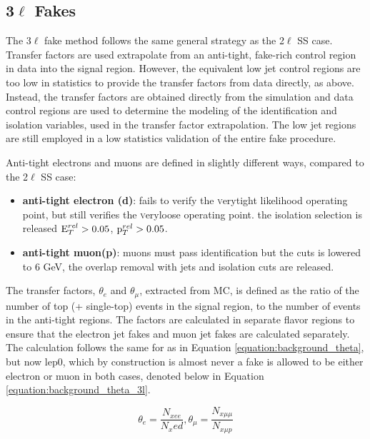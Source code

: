



\subsection{3$\ell$ Fakes}

The 3$\ell$ fake method follows the same general strategy as the 2$\ell$ SS case. Transfer factors are used extrapolate from an anti-tight, fake-rich control region in data into the signal region.  However, the equivalent low jet control regions are too low in statistics to provide the transfer factors from data directly, as above. Instead, the transfer factors are obtained directly from the \ttbar simulation and data control regions are used to determine the modeling of the identification and isolation variables, used in the transfer factor extrapolation. The low jet regions are still employed in a low statistics validation of the entire fake procedure. 

Anti-tight electrons and muons are defined in slightly different ways, compared to the 2$\ell$ SS case:
\begin{itemize}
\item {\bf anti-tight electron (d)}: fails to verify the {\textsc verytight} likelihood operating point, but still verifies the {\textsc veryloose} operating point. the isolation selection is released $\rm E_{T}^{rel}>0.05$,  $\rm p_{T}^{rel}>0.05$.

\item {\bf anti-tight muon(p)}: muons must pass identification but the \pt cuts is lowered to 6 GeV, the overlap removal with jets and isolation cuts are released.
\end{itemize} 
The transfer factors, $\theta_e$ and $\theta_{\mu}$, extracted from MC, is defined as the ratio of the number of top (\ttbar + single-top) events in the signal region, to the number of \ttbar events in the anti-tight regions. The factors are calculated in separate flavor regions to ensure that the electron jet fakes and muon jet fakes are calculated separately. The calculation follows the same for as in Equation \ref{equation:background_theta}, but now lep0, which by construction is almost never a fake is allowed to be either electron or muon in both cases, denoted below in Equation \ref{equation:background_theta_3l}.  

\begin{equation}
\theta_e = \frac{N_{xee}}{N_xed}, \theta_{\mu} = \frac{N_{x\mu\mu}}{N_{x\mu p}}
\label{equation:background_theta_3l}
\end{equation}

